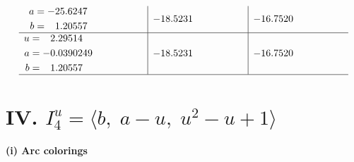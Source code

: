 \documentclass[1p]{elsarticle_modified}
\theoremstyle{definition}
\begin{document}
$$\begin{array}{c|c|c}
\begin{aligned}
a &= -25.6247\phantom{ +0.000000I} \\
b &= \phantom{-}1.20557\phantom{ +0.000000I}\end{aligned}
 & -18.5231\phantom{ +0.000000I} & -16.7520\phantom{ +0.000000I} \\ \hline\begin{aligned}
u &= \phantom{-}2.29514\phantom{ +0.000000I} \\
a &= -0.0390249\phantom{ +0.000000I} \\
b &= \phantom{-}1.20557\phantom{ +0.000000I}\end{aligned}
 & -18.5231\phantom{ +0.000000I} & -16.7520\phantom{ +0.000000I}\\
 \hline 
 \end{array}$$\newpage\newpage\renewcommand{\arraystretch}{1}
\centering \section*{IV. $I^u_{4}= \langle b,\;a- u,\;u^2- u+1 \rangle$}
\flushleft \textbf{(i) Arc colorings}\\
\end{document}
